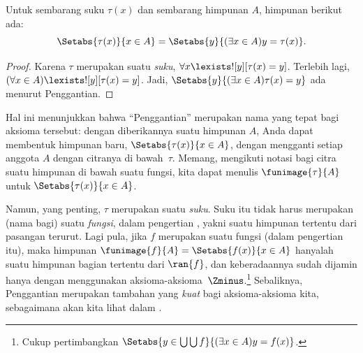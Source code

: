 \documentclass[../../../include/open-logic-section]{subfiles}
\begin{document}
\begin{cor}
Untuk sembarang suku $\tau(x)$ dan sembarang himpunan $A$, himpunan berikut
ada:
\[
	\Setabs{\tau(x)}{x \in A} = \Setabs{y}{(\exists x \in A)y = \tau(x)}.
\]
\end{cor}

\begin{proof}
Karena $\tau$ merupakan suatu \emph{suku}, $\forall x
\lexists![y][\tau(x) = y]$. Terlebih lagi, $(\forall x \in A)
\lexists![y][\tau(x) = y]$. Jadi, $\Setabs{y}{(\exists x \in A)\tau(x) =
y}$ ada menurut Penggantian.
\end{proof}
\noindent
Hal ini menunjukkan bahwa ``Penggantian'' merupakan nama yang tepat bagi
aksioma tersebut: dengan diberikannya suatu himpunan $A$, Anda dapat
membentuk himpunan baru, $\Setabs{\tau(x)}{x \in A}$, dengan mengganti setiap
anggota $A$ dengan citranya di bawah~$\tau$. Memang, mengikuti notasi bagi
citra suatu himpunan di bawah suatu fungsi, kita dapat menulis
$\funimage{\tau}{A}$ untuk $\Setabs{\tau(x)}{x \in A}$.

Namun, yang penting, $\tau$ merupakan suatu \emph{suku}. Suku itu tidak harus
merupakan (nama bagi) suatu \emph{fungsi}, dalam pengertian
, yakni suatu himpunan tertentu dari pasangan
terurut. Lagi pula, jika $f$ merupakan suatu fungsi (dalam pengertian itu),
maka himpunan $\funimage{f}{A} = \Setabs{f(x)}{x \in A}$ hanyalah suatu
himpunan bagian tertentu dari $\ran{f}$, dan keberadaannya sudah dijamin
hanya dengan menggunakan aksioma-aksioma~$\Zminus$.\footnote{Cukup
pertimbangkan $\Setabs{y \in \bigcup \bigcup f}{(\exists x \in A)y =
f(x)}$.} Sebaliknya, Penggantian merupakan tambahan yang \emph{kuat} bagi
aksioma-aksioma kita, sebagaimana akan kita lihat dalam
.
\end{document}

